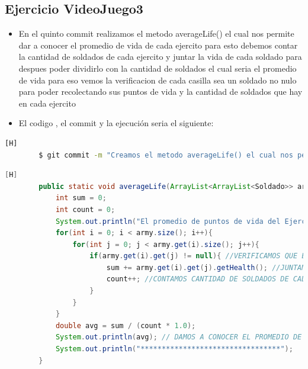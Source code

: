 \documentclass{article}
\begin{document}
	\subsection{Ejercicio VideoJuego3}
	\begin{itemize}	
		\item En el quinto commit realizamos el metodo averageLife() el cual nos permite dar a conocer el promedio de vida de cada ejercito para esto debemos contar la cantidad de soldados de cada ejercito y juntar la vida de cada soldado para despues poder dividirlo con la cantidad de soldados el cual seria el promedio de vida para eso vemos la verificacion de cada casilla sea un soldado no nulo para poder recolectando sus puntos de vida y la cantidad de soldados que hay en cada ejercito
		\item El codigo , el commit  y la ejecución seria el siguiente:
	\end{itemize}	
	\begin{lstlisting}[language=bash,caption={Commit}][H]
		$ git commit -m "Creamos el metodo averageLife() el cual nos permite dar a conocer el promedio de vida de cada ejercito para esto debemos contar la cantidad de soldados de cada ejercito y juntar la vida de cada soldado para despues poder dividirlo con la cantidad de soldados el cual seria el promedio de vida para eso vemos la verificacion de cada casilla sea un soldado no nulo para poder recolectando sus puntos de vida y la cantidad de soldados que hay en cada ejercito
	\end{lstlisting}	
	\begin{lstlisting}[language=java,caption={Las lineas de codigos del metodo creado:}][H]
		public static void averageLife(ArrayList<ArrayList<Soldado>> army, int num){
			int sum = 0;
			int count = 0;
			System.out.println("El promedio de puntos de vida del Ejercito " + num + " es: "); //METODO CREADO QUE NOS PERMITE DAR A CONOCER EL PROMEDIO DE VIDA DE CADA EJERCITO
			for(int i = 0; i < army.size(); i++){
				for(int j = 0; j < army.get(i).size(); j++){
					if(army.get(i).get(j) != null){ //VERIFICAMOS QUE EL SOLDADO DE CADA CASILLA SEA NO NULO 
						sum += army.get(i).get(j).getHealth(); //JUNTAMOS LOS VALORES DE VIDA DE CADA SOLDADO DE CADA EJERCITO 
						count++; //CONTAMOS CANTIDAD DE SOLDADOS DE CADA EJERCITO PARA DESPUES PODER DIVIDIRLO CON LA SUMA DE VIDA DE CADA EJERCITO
					}
				}
			}
			double avg = sum / (count * 1.0);
			System.out.println(avg); // DAMOS A CONOCER EL PROMEDIO DE VIDA DE CADA EJERCITO 
			System.out.println("*********************************");
		}
	\end{lstlisting}
\end{document}
